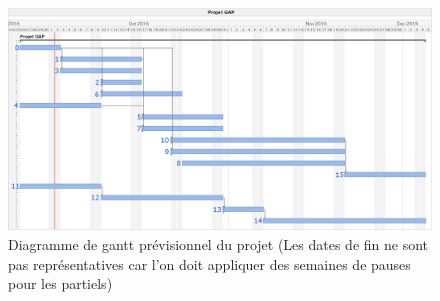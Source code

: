 \documentclass[12pt]{article}
\begin{document}
        \begin{figure}[h]
        \begin{center}
            \includegraphics[width=1\textwidth]{gantt.png}
                \caption{Diagramme de gantt prévisionnel du projet (Les dates de fin ne sont pas représentatives car l'on doit appliquer des semaines de pauses pour les partiels)}
        \end{center}
        \end{figure}
        
\end{document}
